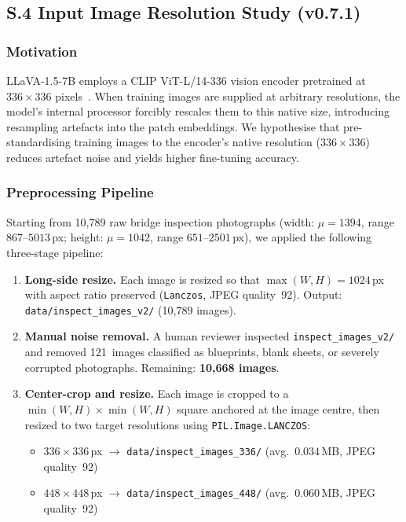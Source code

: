 ﻿\documentclass[onecolumn]{article}
\begin{document}
\subsection*{S.4 Input Image Resolution Study (v0.7.1)}
\label{sec:s4_image_size}

\subsubsection*{Motivation}

LLaVA-1.5-7B employs a CLIP ViT-L/14-336 vision encoder pretrained at
$336\times336$ pixels~\cite{liu2024llava}.
When training images are supplied at arbitrary resolutions, the model's
internal processor forcibly rescales them to this native size, introducing
resampling artefacts into the patch embeddings.
We hypothesise that pre-standardising training images to the encoder's
native resolution ($336\times336$) reduces artefact noise and yields
higher fine-tuning accuracy.

\subsubsection*{Preprocessing Pipeline}

Starting from 10{,}789 raw bridge inspection photographs
(width: $\mu=1394$, range $867$--$5013$\,px;
height: $\mu=1042$, range $651$--$2501$\,px),
we applied the following three-stage pipeline:

\begin{enumerate}
  \item \textbf{Long-side resize.}
        Each image is resized so that $\max(W,H)=1024$\,px with
        aspect ratio preserved (\texttt{Lanczos}, JPEG quality~92).
        Output: \texttt{data/inspect\_images\_v2/} (10{,}789 images).

  \item \textbf{Manual noise removal.}
        A human reviewer inspected \texttt{inspect\_images\_v2/} and
        removed 121~images classified as blueprints, blank sheets, or
        severely corrupted photographs.
        Remaining: \textbf{10{,}668 images}.

  \item \textbf{Center-crop and resize.}
        Each image is cropped to a $\min(W,H)\times\min(W,H)$ square
        anchored at the image centre, then resized to two target
        resolutions using \texttt{PIL.Image.LANCZOS}:
        \begin{itemize}
          \item $336\times336$\,px $\rightarrow$
                \texttt{data/inspect\_images\_336/}
                (avg.\ $0.034$\,MB, JPEG quality~92)
          \item $448\times448$\,px $\rightarrow$
                \texttt{data/inspect\_images\_448/}
                (avg.\ $0.060$\,MB, JPEG quality~92)
        \end{itemize}
\end{enumerate}
\end{document}
